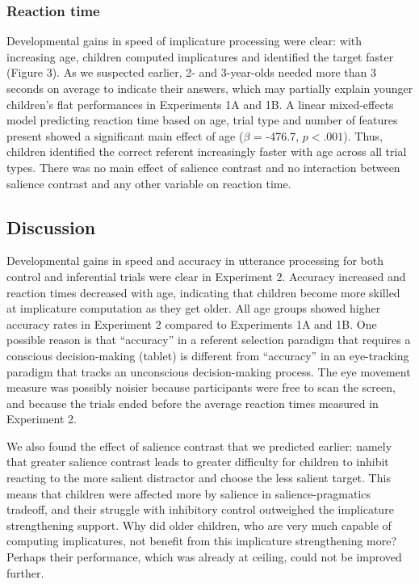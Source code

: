 \documentclass[a4paper,man,apacite,floatsintext]{apa6}
\begin{document}
\subsubsection{Reaction time}\label{reaction-time}

Developmental gains in speed of implicature processing were clear: with
increasing age, children computed implicatures and identified the target
faster (Figure 3). As we suspected earlier, 2- and 3-year-olds needed
more than 3 seconds on average to indicate their answers, which may
partially explain younger children's flat performances in Experiments 1A
and 1B. A linear mixed-effects model predicting reaction time based on
age, trial type and number of features present showed a significant main
effect of age (\(\beta\) = -476.7, \(p < .001\)). Thus, children
identified the correct referent increasingly faster with age across all
trial types. There was no main effect of salience contrast and no
interaction between salience contrast and any other variable on reaction
time.

\subsection{Discussion}\label{discussion-2}

Developmental gains in speed and accuracy in utterance processing for
both control and inferential trials were clear in Experiment 2. Accuracy
increased and reaction times decreased with age, indicating that
children become more skilled at implicature computation as they get
older. All age groups showed higher accuracy rates in Experiment 2
compared to Experiments 1A and 1B. One possible reason is that
``accuracy'' in a referent selection paradigm that requires a conscious
decision-making (tablet) is different from ``accuracy'' in an
eye-tracking paradigm that tracks an unconscious decision-making
process. The eye movement measure was possibly noisier because
participants were free to scan the screen, and because the trials ended
before the average reaction times measured in Experiment 2.

We also found the effect of salience contrast that we predicted earlier:
namely that greater salience contrast leads to greater difficulty for
children to inhibit reacting to the more salient distractor and choose
the less salient target. This means that children were affected more by
salience in salience-pragmatics tradeoff, and their struggle with
inhibitory control outweighed the implicature strengthening support. Why
did older children, who are very much capable of computing implicatures,
not benefit from this implicature strengthening more? Perhaps their
performance, which was already at ceiling, could not be improved
further.
\end{document}
